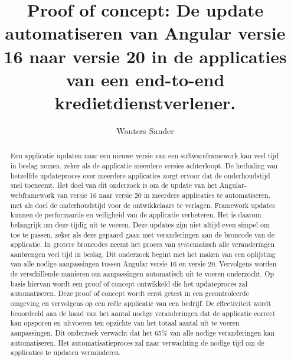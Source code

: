 \documentclass{hogent-article}
\title{Proof of concept: De update automatiseren van Angular versie 16 naar versie 20 in de applicaties van een end-to-end kredietdienstverlener.}
\author{Wauters Sander}
\begin{document}
\begin{abstract}

Een applicatie updaten naar een nieuwe versie van een softwareframework kan veel tijd in beslag nemen, zeker als de applicatie meerdere versies achterloopt.
De herhaling van hetzelfde updateproces over meerdere applicaties zorgt ervoor dat de onderhoudstijd snel toeneemt.
Het doel van dit onderzoek is om de update van het Angular-webframework van versie 16 naar versie 20 in meerdere applicaties te automatiseren, met als doel de onderhoudstijd voor de ontwikkelaars te verlagen.
Framework updates kunnen de performantie en veiligheid van de applicatie verbeteren.
Het is daarom belangrijk om deze tijdig uit te voeren.
Deze updates zijn niet altijd even simpel om toe te passen, zeker als deze gepaard gaan met veranderingen aan de broncode van de applicatie.
In grotere broncodes neemt het proces van systematisch alle veranderingen aanbrengen veel tijd in beslag.
Dit onderzoek begint met het maken van een oplijsting van alle nodige aanpassingen tussen Angular versie 16 en versie 20.
Vervolgens worden de verschillende manieren om aanpassingen automatisch uit te voeren onderzocht.
Op basis hiervan wordt een proof of concept ontwikkeld die het updateproces zal automatiseren.
Deze proof of concept wordt eerst getest in een gecontroleerde omgeving en vervolgens op een reële applicatie van een bedrijf.
De effectiviteit wordt beoordeeld aan de hand van het aantal nodige veranderingen dat de applicatie correct kan opsporen en uitvoeren ten opzichte van het totaal aantal uit te voeren aanpassingen.
Dit onderzoek verwacht dat het 65\% van alle nodige veranderingen kan automatiseren.
Het automatisatieproces zal naar verwachting de nodige tijd om de applicaties te updaten verminderen.

\end{abstract}

\tableofcontents



\printbibliography[heading=bibintoc]
\end{document}
